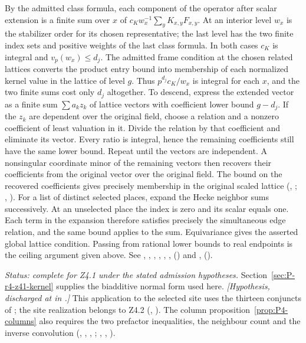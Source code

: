 By the admitted class formula, each component of the operator after
scalar extension is a finite sum over $x$ of
$c_K w_x^{-1}\sum_y K_{x,y}F_{x,y}$.
At an interior level $w_x$ is the stabilizer order for its chosen
representative; the last level has the two finite index sets and positive
weights of the last class formula. In both cases $c_K$ is integral
and $v_p(w_x)\le d_j$. The admitted frame condition at the chosen
related lattices converts the product entry bound into membership
of each normalized kernel value in the lattice of level $g$.
Thus $p^{d_j}c_K/w_x$ is integral for each $x$, and the two finite
sums cost only $d_j$ altogether. To descend, express the extended vector as a finite sum
$\sum a_k z_k$ of lattice vectors with coefficient lower bound
$g-d_j$. If the $z_k$ are dependent over the original field, choose a
relation and a nonzero coefficient of least valuation in it. Divide
the relation by that coefficient and eliminate its vector. Every
ratio is integral, hence the remaining coefficients still have the
same lower bound. Repeat until the vectors are independent. A
nonsingular coordinate minor of the remaining vectors then recovers
their coefficients from the original vector over the original field.
The bound on the recovered coefficients gives precisely membership
in the original scaled lattice (,
; , ). For a list of distinct selected places, expand the Hecke
neighbor sums successively. At an unselected place the index is zero
and its scalar equals one. Each term in the expansion therefore
satisfies precisely the simultaneous edge relation, and the same bound
applies to the sum. Equivariance gives the asserted global lattice
condition. Passing from rational lower bounds to real endpoints is the
ceiling argument given above. See , ,
, , ,
, 
() and
, 
().

\emph{Status: complete for Z4.1 under the stated admission hypotheses.}
Section~\ref{sec:P-r4-z41-kernel} supplies the biadditive normal form
used here. \textit{[Hypothesis, discharged at
 in .]}
This application to the selected site uses the thirteen conjuncts of
; the site realization belongs to Z4.2
(,
).
The column proposition~\ref{prop:P4-columns} also requires the two
prefactor inequalities, the neighbour count and the inverse convolution
(, , , ;
,
,
).


